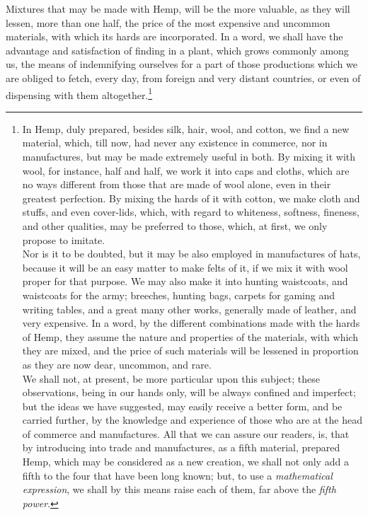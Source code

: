 \documentclass[a4paper, 11pt, oneside, polutonikogreek, english]{article}
\begin{document}
Mixtures that may be made with Hemp, will be the more valuable, as they will lessen, more than one half, the price of the most expensive and uncommon materials, with which its hards are incorporated. In a word, we shall have the advantage and satisfaction of finding in a plant, which grows commonly among us, the means of indemnifying ourselves for a part of those productions which we are obliged to fetch, every day, from foreign and very distant countries, or even of dispensing with them altogether.\footnote{In Hemp, duly prepared, besides silk, hair, wool, and cotton, we find a new material, which, till now, had never any existence in commerce, nor in manufactures, but may be made extremely useful in both. By mixing it with wool, for instance, half and half, we work it into caps and cloths, which are no ways different from those that are made of wool alone, even in their greatest perfection. By mixing the hards of it with cotton, we make cloth and stuffs, and even cover-lids, which, with regard to whiteness, softness, fineness, and other qualities, may be preferred to those, which, at first, we only propose to imitate.\\\hspace*{5mm}Nor is it to be doubted, but it may be also employed in manufactures of hats, because it will be an easy matter to make felts of it, if we mix it with wool proper for that purpose. We may also make it into hunting waistcoats, and waistcoats for the army; breeches, hunting bags, carpets for gaming and writing tables, and a great many other works, generally made of leather, and very expensive.  In a word, by the different combinations made with the hards of Hemp, they assume the nature and properties of the materials, with which they are mixed, and the price of such materials will be lessened in proportion as they are now dear, uncommon, and rare.\\\hspace*{5mm}We shall not, at present, be more particular upon this subject; these observations, being in our hands only, will be always confined and imperfect; but the ideas we have suggested, may easily receive a better form, and be carried further, by the knowledge and experience of those who are at the head of commerce and manufactures. All that we can assure our readers, is, that by introducing into trade and manufactures, as a fifth material, prepared Hemp, which may be considered as a new creation, we shall not only add a fifth to the four that have been long known; but, to use a \emph{mathematical expression}, we shall by this means raise each of them, far above the \emph{fifth power}.}
\end{document}

